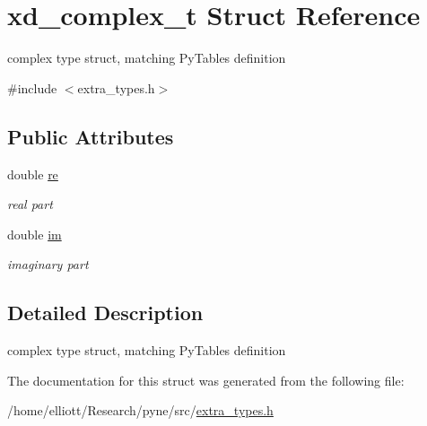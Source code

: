 \hypertarget{structxd__complex__t}{\section{xd\-\_\-complex\-\_\-t Struct Reference}
\label{structxd__complex__t}
}


complex type struct, matching Py\-Tables definition  




{\ttfamily \#include $<$extra\-\_\-types.\-h$>$}

\subsection*{Public Attributes}
\begin{DoxyCompactItemize}
\item 
\hypertarget{structxd__complex__t_afbbb6ed1fe3b729258421cb3eaa8c4d8}{double \hyperlink{structxd__complex__t_afbbb6ed1fe3b729258421cb3eaa8c4d8}{re}}\label{structxd__complex__t_afbbb6ed1fe3b729258421cb3eaa8c4d8}

\begin{DoxyCompactList}\small\item\em real part \end{DoxyCompactList}\item 
\hypertarget{structxd__complex__t_afb1d09ccfa0e10044572c8a7bf4806f2}{double \hyperlink{structxd__complex__t_afb1d09ccfa0e10044572c8a7bf4806f2}{im}}\label{structxd__complex__t_afb1d09ccfa0e10044572c8a7bf4806f2}

\begin{DoxyCompactList}\small\item\em imaginary part \end{DoxyCompactList}\end{DoxyCompactItemize}


\subsection{Detailed Description}
complex type struct, matching Py\-Tables definition 

The documentation for this struct was generated from the following file\-:\begin{DoxyCompactItemize}
\item 
/home/elliott/\-Research/pyne/src/\hyperlink{extra__types_8h}{extra\-\_\-types.\-h}\end{DoxyCompactItemize}
